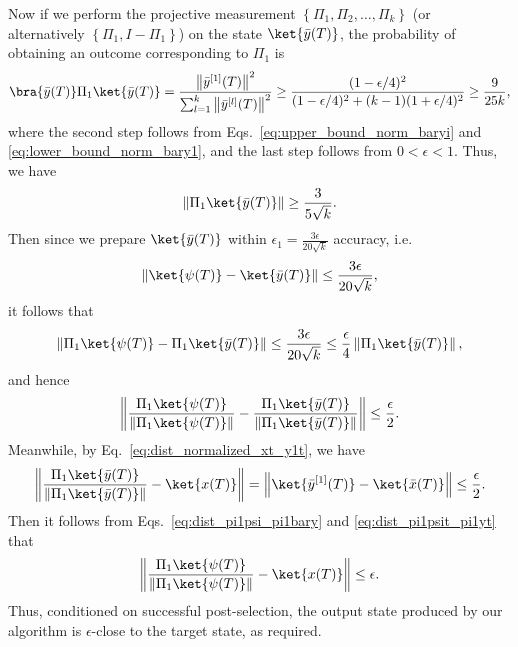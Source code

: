 \documentclass[superscriptaddress,onecolumn,nofootinbib,longbibliography,a4paper,accepted=2026-09-29]{quantumarticle}
\theoremstyle{plain}
\theoremstyle{definition}
\numberwithin{thm}{section}
\numberwithin{assumption}{section}
\numberwithin{lemma}{section}
\numberwithin{prop}{section}
\numberwithin{cor}{section}
\numberwithin{definition}{section}
\numberwithin{rmk}{section}
\numberwithin{equation}{section}
\newcommand{\norm}[1]     {\left\| #1 \right\|}
\newcommand{\lrcb}[1]{\left \{ #1 \right \}}
\begin{document}
Now if we perform the projective measurement $\lrcb{\Pi_1, \Pi_2, \dots, \Pi_k}$ (or alternatively $\lrcb{\Pi_1, I-\Pi_1}$) on the state $\ket{\bar{y}(T)}$, the probability of obtaining an outcome corresponding to $\Pi_1$ is
\begin{align}
    \bra{\bar{y}(T)} \Pi_1 \ket{\bar{y}(T)} = 
    \frac{\norm{\bar{y}^{[1]}(T)}^2}{\sum_{l=1}^k\norm{\bar{y}^{[l]}(T)}^2}
    \ge \frac{(1-\epsilon/4)^2}{(1-\epsilon/4)^2+ (k-1) (1+\epsilon/4)^2}
    \ge \frac{9}{25k},
\end{align}
where the second step follows from Eqs.~\eqref{eq:upper_bound_norm_baryi} and \eqref{eq:lower_bound_norm_bary1}, and the last step follows from $0<\epsilon<1$. Thus, we have
\begin{align}
\norm{\Pi_1 \ket{\bar{y}(T)}} \ge \frac{3}{5\sqrt{k}}.  
\label{eq:lower_bound_pi1_bary}
\end{align}
Then since we prepare $\ket{\bar{y}(T)}$ within $\epsilon_1=\frac{3\epsilon}{20\sqrt{k}}$ accuracy, i.e.
\begin{align}
\norm{\ket{\psi(T)} - \ket{\bar{y}(T)}} \le \frac{3\epsilon}{20\sqrt{k}},
\end{align}
it follows that
\begin{align}
\norm{\Pi_1 \ket{\psi(T)} - \Pi_1 \ket{\bar{y}(T)}} \le    \frac{3\epsilon}{20\sqrt{k}} \le \frac{\epsilon}{4} \norm{\Pi_1 \ket{\bar{y}(T)}},
\label{eq:dist_pi1psi_pi1bary}
\end{align}
and hence
\begin{align}
\norm{\frac{\Pi_1 \ket{\psi(T)}}{\norm{\Pi_1 \ket{\psi(T)}}} - \frac{\Pi_1 \ket{\bar{y}(T)}}{\norm{\Pi_1 \ket{\bar{y}(T)}}}} \le \frac{\epsilon}{2}. 
\label{eq:dist_pi1psit_pi1yt}
\end{align}
Meanwhile, by Eq.~\eqref{eq:dist_normalized_xt_y1t}, we have
\begin{align}
\norm{
\frac{\Pi_1 \ket{\bar{y}(T)}}{\norm{\Pi_1 \ket{\bar{y}(T)}}} -  \ket{x(T)}} 
= 
\norm{ \ket{\bar{y}^{[1]}(T)}
- \ket{\bar{x}(T)}}
\le \frac{\epsilon}{2}.
\label{eq:dist_pi1yt_xt}
\end{align} 
Then it follows from Eqs.~\eqref{eq:dist_pi1psi_pi1bary} and \eqref{eq:dist_pi1psit_pi1yt} that
\begin{align}
\norm{\frac{\Pi_1 \ket{\psi(T)}}{\norm{\Pi_1 \ket{\psi(T)}}} -  \ket{x(T)}} \le \epsilon. 
\end{align}
Thus, conditioned on successful post-selection, the output state produced by our algorithm is $\epsilon$-close to the target state, as required.
\end{document}
